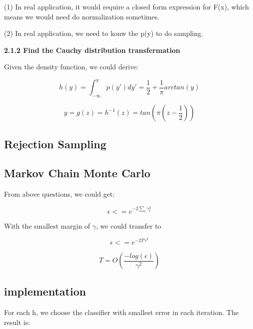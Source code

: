 \documentclass{article} %
\begin{document}
(1) In real application, it would require a closed form expression for F(x),
which means we would need do normalization sometimes.

(2) In real application, we need to konw the p(y) to do sampling.

\textbf{2.1.2 Find the Cauchy distribution transfermation}

Given the density function, we could derive:

\begin{equation}
h (y) = \int_{-\infty}^y p(y') dy' = \frac{1}{2} + \frac{1}{\pi} arctan(y)
\end{equation}

\begin{equation}
y = g (z) = h^{-1} (z) = tan(\pi (z - \frac{1}{2}))
\end{equation}


\subsection{Rejection Sampling}












\subsection{Markov Chain Monte Carlo}
From above questions, we could get:

\begin{equation}
\epsilon <= e^{-2 \sum_t \gamma_t^2}
\end{equation}

With the smallest margin of $\gamma$, we could transfer to

\begin{equation}
\epsilon <= e^{-2 T \gamma^2}
\end{equation}

\begin{equation}
T = O (\frac{-log (\epsilon)}{\gamma^2})
\end{equation}


\subsection{implementation}
For each h, we choose the classifier with smallest error in each
iteration. The result is:
\end{document}
